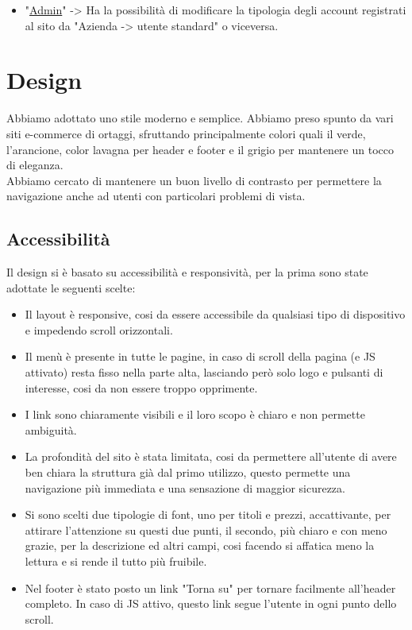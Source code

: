 \begin{itemize}
	\item "\underline{Admin}" -> Ha la possibilità di modificare la tipologia degli account registrati al sito da "Azienda -> utente standard" o viceversa.
\end{itemize}

\section{Design}
	Abbiamo adottato uno stile moderno e semplice. Abbiamo preso spunto da vari siti e-commerce di ortaggi, sfruttando principalmente colori quali il verde, l'arancione, color lavagna per header e footer e il grigio per mantenere un tocco di eleganza.\\ Abbiamo cercato di mantenere un buon livello di contrasto per permettere la navigazione anche ad utenti con particolari problemi di vista.

\subsection{Accessibilità}
Il design si è basato su accessibilità e responsività, per la prima sono state adottate le seguenti scelte:
\begin{itemize}
	\item Il layout è responsive, cosi da essere accessibile da qualsiasi tipo di dispositivo e impedendo scroll orizzontali.
	\item Il menù è presente in tutte le pagine, in caso di scroll della pagina (e JS attivato) resta fisso nella parte alta, lasciando però solo logo e pulsanti di interesse, cosi da non essere troppo opprimente.
	\item I link sono chiaramente visibili e il loro scopo è chiaro e non permette ambiguità.
	\item La profondità del sito è stata limitata, cosi da permettere all'utente di avere ben chiara la struttura già dal primo utilizzo, questo permette una navigazione più immediata e una sensazione di maggior sicurezza.
	\item Si sono scelti due tipologie di font, uno per titoli e prezzi, accattivante, per attirare l'attenzione su questi due punti, il secondo, più chiaro e con meno grazie, per la descrizione ed altri campi, cosi facendo si affatica meno la lettura e si rende il tutto più fruibile.
	\item Nel footer è stato posto un link "Torna su" per tornare facilmente all'header completo. In caso di JS attivo, questo link segue l'utente in ogni punto dello scroll. 
\end{itemize}
